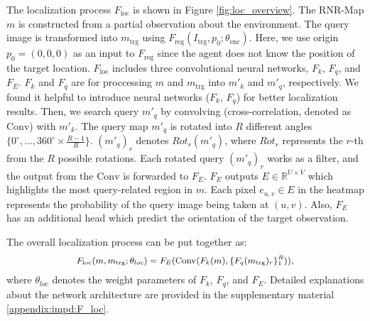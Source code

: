 \documentclass[10pt,twocolumn,letterpaper]{article}
\def\proposed{RNR-Map\xspace}
\begin{document}
The localization process $F_\mathrm{loc}$ is shown in Figure \ref{fig:loc_overview}.
%
The \proposed $m$ is constructed from a partial observation about the environment.
%
The query image is transformed into $m_\mathrm{trg}$ using $F_\mathrm{reg}(I_\mathrm{trg}, p_0 ; \theta_\mathrm{enc}).$
%
%
Here, we use origin $p_0 = (0,0,0)$ as an input to $F_\mathrm{reg}$ since the agent does not know the position of the target location.
%
$F_\mathrm{loc}$ includes three convolutional neural networks, $F_k$, $F_q$, and $F_E$.
%
$F_k$ and $F_q$ are for proccessing $m$ and $m_\mathrm{trg}$ into $m'_k$ and $m'_q$, respectively.
%
We found it helpful to introduce neural networks ($F_k$, $F_q$) for better localization results. 
%
Then, we search query $m'_q$ by convolving (cross-correlation, denoted as $\mathrm{Conv}$) with $m'_k$.
%
%
The query map $m'_q$ is rotated into $R$ different angles $\{0^\circ, ..., 360^\circ \times \frac{R-1}{R}\}$. 
%
$(m'_{q})_r$ denotes $Rot_r(m'_q)$, where $Rot_r$ represents the $r$-th from the $R$ possible rotations.
%
Each rotated query $(m'_{q})_r$ works as a filter, and the output from the $\mathrm{Conv}$ is forwarded to $F_E$. %
%
$F_E$ outputs $E \in\mathbb{R}^{U\times V}$ which highlights the most query-related region in $m$.
%
Each pixel  $e_{u,v} \in E$ in the heatmap represents the probability of the query image being taken at $(u,v)$. 
%
Also, $F_E$ has an additional head which predict the orientation of the target observation.

The overall localization process can be put together as:
\begin{equation} \label{eq:target_embed}
\small
\begin{split}
    F_\mathrm{loc}(m, m_{\mathrm{trg}}; \theta_{loc}) = F_E(\mathrm{Conv}(F_k(m), \{F_q(m_{\mathrm{trg}})_r\}_1^R)),
\end{split}
\end{equation}
where $\theta_{loc}$ denotes the weight parameters of $F_k$, $F_q$, and $F_E$.
%
Detailed explanations about the network architecture are provided in the supplementary material \ref{appendix:impd:F_loc}.
%
\end{document}

